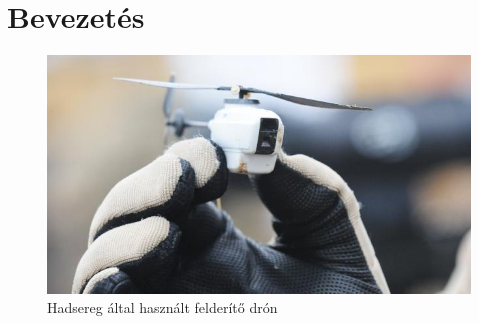 \newpage

\chapter{Bevezetés}

		\begin{figure}[h]
			\centering
			\includegraphics[width=\textwidth]{./images/drone_army}
			\caption{Hadsereg által használt felderítő drón \cite{drone_army}}
		\end{figure}
